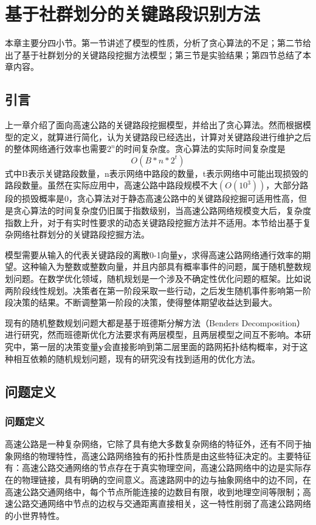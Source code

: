 
\chapter{基于社群划分的关键路段识别方法}
	本章主要分四小节。第一节讲述了模型的性质，分析了贪心算法的不足；第二节给出了基于社群划分的关键路段挖掘方法模型；第三节是实验结果；第四节总结了本章内容。
	\section{引言}
		上一章介绍了面向高速公路的关键路段挖掘模型，并给出了贪心算法。然而根据模型的定义，就算进行简化，认为关键路段已经选出，计算对关键路段进行维护之后的整体网络通行效率也需要$2^n$的时间复杂度。贪心算法的实际时间复杂度是
		$$O(B*n*2^t)$$
		式中B表示关键路段数量，n表示网络中路段的数量，t表示网络中可能出现损毁的路段数量。虽然在实际应用中，高速公路中路段规模不大$(O(10^3))$，大部分路段的损毁概率是0，贪心算法对于静态高速公路中的关键路段挖掘可适用性高，但是贪心算法的时间复杂度仍旧属于指数级别，当高速公路网络规模变大后，复杂度指数上升，对于有实时性要求的动态关键路段挖掘方法并不适用。本节给出基于复杂网络社群划分的关键路段挖掘方法。

		模型需要从输入的代表关键路段的离散0-1向量$\bm{y}$，求得高速公路网络通行效率的期望。这种输入为整数或整数向量，并且内部具有概率事件的问题，属于随机整数规划问题。在数学优化领域，随机规划是一个涉及不确定性优化问题的框架。比如说两阶段线性规划。决策者在第一阶段采取一些行动，之后发生随机事件影响第一阶段决策的结果。不断调整第一阶段的决策，使得整体期望收益达到最大。

		现有的随机整数规划问题大都是基于班德斯分解方法（Benders Decomposition）进行研究，然而班德斯优化方法要求有两层模型，且两层模型之间互不影响。本研究中，第一层的决策变量$\bm{y}$会直接影响到第二层里面的路网拓扑结构概率，对于这种相互依赖的随机规划问题，现有的研究没有找到适用的优化方法。

	\section{问题定义}


		\subsection{问题定义}

			高速公路是一种复杂网络，它除了具有绝大多数复杂网络的特征外，还有不同于抽象网络的物理特性，高速公路网络独有的拓扑性质是由这些特征决定的。主要特征有：高速公路交通网络的节点存在于真实物理空间，高速公路网络中的边是实际存在的物理链接，具有明确的空间意义。高速路网中的边与抽象网络中的边不同，在高速公路交通网络中，每个节点所能连接的边数目有限，收到地理空间等限制；高速公路交通网络中节点的边权与交通距离直接相关，这一特性削弱了高速公路网络的小世界特性\parencite{ysk2017qx}。

